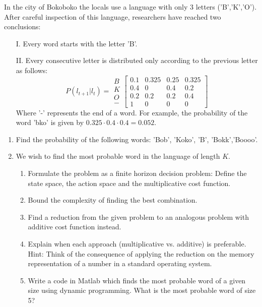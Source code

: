 \begin{exercise}
In the city of Bokoboko the locals use a language with only 3 letters ('B','K','O'). After careful inspection of this language, researchers have reached two conclusions:
\begin{itemize}
  \item[I.]	Every word starts with the letter 'B'.
  \item[II.] Every consecutive letter is distributed only according to the previous letter as follows:
\[P\left( {{l_{t + 1}}|{l_t}} \right) = \begin{array}{*{20}{c}}
B\\
K\\
O\\
 -
\end{array}\left[ {\begin{array}{*{20}{c}}
{0.1}&{0.325}&{0.25}&{0.325}\\
{0.4}&0&{0.4}&{0.2}\\
{0.2}&{0.2}&{0.2}&{0.4}\\
1&0&0&0
\end{array}} \right]\]
Where '-' represents the end of a word. For example, the probability of the word 'bko' is given by $0.325 \cdot 0.4 \cdot 0.4 = 0.052$.
\end{itemize}

\begin{enumerate}
  \item Find the probability of the following words: 'Bob', 'Koko', 'B', 'Bokk','Boooo'.
  \item We wish to find the most probable word in the language of length $K$.
\begin{enumerate}
  \item Formulate the problem as a finite horizon decision problem: Define the state space, the action space and the multiplicative cost function.
  \item Bound the complexity of finding the best combination.
  \item Find a reduction from the given problem to an analogous problem with additive cost function instead.
  \item Explain when each approach (multiplicative vs. additive) is preferable. \\Hint: Think of the consequence of applying the reduction on the memory representation of a number in a standard operating system.
  \item Write a code in Matlab which finds the most probable word of a given size using dynamic programming. What is the most probable word of size 5?
\end{enumerate}
\end{enumerate}
\end{exercise}

